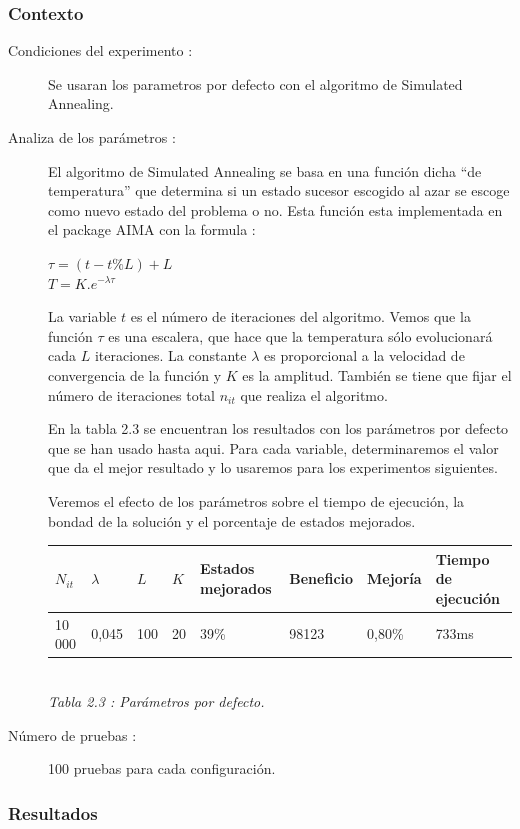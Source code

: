 \documentclass{article}
\begin{document}
\subsubsection{Contexto}
\begin{description}
\item[Condiciones del experimento :] Se usaran los parametros por defecto con
el algoritmo de Simulated Annealing.
\item[Analiza de los parámetros :] El algoritmo de Simulated Annealing se basa
en una función dicha ``de temperatura'' que determina si un estado sucesor
escogido al azar se escoge como nuevo estado del problema o no. Esta función
esta implementada en el package AIMA con la formula :
\begin{center}
$\tau = (t-t\%L)+L$\\
$T = K.e^{-\lambda \tau}$
\end{center}
La variable $t$ es el número de iteraciones del algoritmo. Vemos que la función
$\tau$ es una escalera, que hace que la temperatura sólo evolucionará cada $L$
iteraciones. La constante $\lambda$ es proporcional a la velocidad de
convergencia de la función y $K$ es la amplitud. También se tiene que fijar el
número de iteraciones total $n_{it}$ que realiza el algoritmo.

En la tabla 2.3 se encuentran los resultados con los parámetros por defecto que
se han usado hasta aqui. Para cada variable, determinaremos el valor que da el
mejor resultado y lo usaremos para los experimentos siguientes.

Veremos el efecto de los parámetros sobre el tiempo de ejecución, la bondad de
la solución y el porcentaje de estados mejorados.

\begin{center}
\begin{tabular}{|l|l|l|l||l|l|l|l|}
\hline
$N_{it}$ & $\lambda$ & $L$ & $K$ & Estados mejorados & Beneficio & Mejoría & 
Tiempo de ejecución\\
\hline
10 000 & 0,045 & 100 & 20 & 39\% & 98123 & 0,80\% & 733ms\\
\hline
\end{tabular}\\
{\it Tabla 2.3 : Parámetros por defecto.}
\end{center}
\item[Número de pruebas :] 100 pruebas para cada configuración.
\end{description}

\subsubsection{Resultados}
\end{document}
